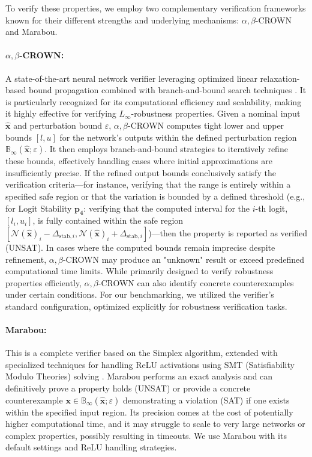   To verify these properties, we employ two complementary verification frameworks known for their different strengths and underlying mechanisms: \(\alpha,\beta\)-CROWN and Marabou.
  

  \paragraph{\(\alpha,\beta\)-CROWN:} 
A state-of-the-art neural network verifier leveraging optimized linear relaxation-based bound propagation combined with branch-and-bound search techniques \cite{wang2021beta, zhang2018efficient, xu2021fast, zhou2024scalable}. It is particularly recognized for its computational efficiency and scalability, making it highly effective for verifying \(L_\infty\)-robustness properties. Given a nominal input \(\boldsymbol{\hat{x}}\) and perturbation bound \(\varepsilon\), \(\alpha,\beta\)-CROWN computes tight lower and upper bounds \([l, u]\) for the network's outputs within the defined perturbation region \(\mathbb{B}_\infty(\boldsymbol{\hat{x}}; \varepsilon)\). It then employs branch-and-bound strategies to iteratively refine these bounds, effectively handling cases where initial approximations are insufficiently precise. If the refined output bounds conclusively satisfy the verification criteria—for instance, verifying that the range is entirely within a specified safe region or that the variation is bounded by a defined threshold (e.g., for Logit Stability $\mathbf{p_4}$: verifying that the computed interval for the $i$-th logit, $[l_i, u_i]$, is fully contained within the safe region $[\mathcal{N}(\boldsymbol{\hat{x}})_i - \Delta_{\text{stab},i}, \mathcal{N}(\boldsymbol{\hat{x}})_i + \Delta_{\text{stab},i}]$)—then the property is reported as verified (UNSAT). In cases where the computed bounds remain imprecise despite refinement, \(\alpha,\beta\)-CROWN may produce an "unknown" result or exceed predefined computational time limits. While primarily designed to verify robustness properties efficiently, \(\alpha,\beta\)-CROWN can also identify concrete counterexamples under certain conditions. For our benchmarking, we utilized the verifier's standard configuration, optimized explicitly for robustness verification tasks.

  
  \paragraph{Marabou:} This is a complete verifier based on the Simplex algorithm, extended with specialized techniques for handling ReLU activations using SMT (Satisfiability Modulo Theories) solving \cite{katz2019marabou}. Marabou performs an exact analysis and can definitively prove a property holds (UNSAT) or provide a concrete counterexample \(\boldsymbol{x} \in \mathbb{B}_\infty(\boldsymbol{\hat{x}}; \varepsilon)\) demonstrating a violation (SAT) if one exists within the specified input region. Its precision comes at the cost of potentially higher computational time, and it may struggle to scale to very large networks or complex properties, possibly resulting in timeouts. We use Marabou with its default settings and ReLU handling strategies.


